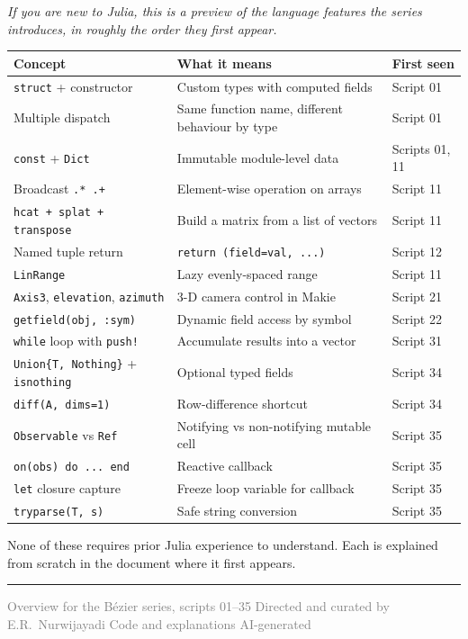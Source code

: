 \documentclass[12pt, a4paper]{article}
\newcommand{\cd}[1]{\texttt{#1}}
\begin{document}
\textit{If you are new to Julia, this is a preview of the
language features the series introduces, in roughly the
order they first appear.}

\begin{center}
\renewcommand{\arraystretch}{1.3}
\begin{tabular}{p{3.5cm}p{5cm}l}
\toprule
Concept & What it means & First seen \\
\midrule
\cd{struct} + constructor &
  Custom types with computed fields &
  Script 01 \\
Multiple dispatch &
  Same function name, different behaviour by type &
  Script 01 \\
\cd{const} + \cd{Dict} &
  Immutable module-level data &
  Scripts 01, 11 \\
Broadcast \cd{.* .+} &
  Element-wise operation on arrays &
  Script 11 \\
\cd{hcat + splat + transpose} &
  Build a matrix from a list of vectors &
  Script 11 \\
Named tuple return &
  \cd{return (field=val, ...)} &
  Script 12 \\
\cd{LinRange} &
  Lazy evenly-spaced range &
  Script 11 \\
\cd{Axis3}, \cd{elevation}, \cd{azimuth} &
  3-D camera control in Makie &
  Script 21 \\
\cd{getfield(obj, :sym)} &
  Dynamic field access by symbol &
  Script 22 \\
\cd{while} loop with \cd{push!} &
  Accumulate results into a vector &
  Script 31 \\
\cd{Union\{T, Nothing\}} + \cd{isnothing} &
  Optional typed fields &
  Script 34 \\
\cd{diff(A, dims=1)} &
  Row-difference shortcut &
  Script 34 \\
\cd{Observable} vs \cd{Ref} &
  Notifying vs non-notifying mutable cell &
  Script 35 \\
\cd{on(obs) do ... end} &
  Reactive callback &
  Script 35 \\
\cd{let} closure capture &
  Freeze loop variable for callback &
  Script 35 \\
\cd{tryparse(T, s)} &
  Safe string conversion &
  Script 35 \\
\bottomrule
\end{tabular}
\end{center}

None of these requires prior Julia experience to understand.
Each is explained from scratch in the document where it
first appears.

\vspace{2em}\hrule\vspace{0.5em}
{\small\textcolor{gray}{%
Overview for the B\'ezier series, scripts 01--35
\textbar{} Directed and curated by E.R.\ Nurwijayadi
\textbar{} Code and explanations AI-generated}}
\end{document}
